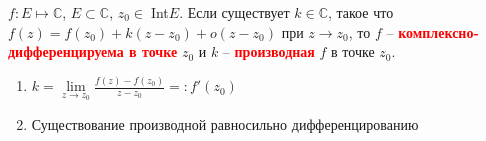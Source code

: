 
\begin{definition} \thmslash
	
	$f : E \mapsto \mathbb{C}$, $E \subset \mathbb{C}$, $z_0 \in \;$Int$ E$. Если существует $k \in \mathbb{C}$, такое что $f(z) = f(z_0) + k(z - z_0) + o(z - z_0)$ при $z \rightarrow z_0$, то $f$ -- \textcolor{red}{\textbf{комплексно-дифференцируема в точке}} $z_0$ и $k$ -- \textcolor{red}{\textbf{производная}} $f$ в точке $z_0$.
\end{definition}

\begin{remark} \thmslash

	\begin{enumerate} 
		\item $k = \lim\limits_{z \to z_0} \frac{f(z) - f(z_0)}{z - z_0} =: f'(z_0)$
		\item Существование производной равносильно дифференцированию
	\end{enumerate}
\end{remark}

